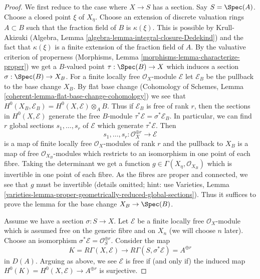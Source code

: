 \begin{proof}
We first reduce to the case where $X \to S$ has a section. Say $S = \Spec(A)$.
Choose a closed point $\xi$ of $X_\eta$. Choose an extension
of discrete valuation rings $A \subset B$ such that the fraction field
of $B$ is $\kappa(\xi)$. This is possible by Krull-Akizuki
(Algebra, Lemma \ref{algebra-lemma-integral-closure-Dedekind})
and the fact that $\kappa(\xi)$ is a finite extension of the
fraction field of $A$.
By the valuative criterion of properness
(Morphisms, Lemma \ref{morphisms-lemma-characterize-proper})
we get a $B$-valued point $\tau : \Spec(B) \to X$
which induces a section $\sigma : \Spec(B) \to X_B$.
For a finite locally free $\mathcal{O}_X$-module $\mathcal{E}$
let $\mathcal{E}_B$ be the pullback to the base change $X_B$.
By flat base change
(Cohomology of Schemes, Lemma \ref{coherent-lemma-flat-base-change-cohomology})
we see that $H^0(X_B, \mathcal{E}_B) = H^0(X, \mathcal{E}) \otimes_A B$.
Thus if $\mathcal{E}_B$ is free of rank $r$, then the sections in
$H^0(X, \mathcal{E})$ generate the free $B$-module
$\tau^*\mathcal{E} = \sigma^*\mathcal{E}_B$.
In particular, we can find $r$ global sections $s_1, \ldots, s_r$
of $\mathcal{E}$ which generate $\tau^*\mathcal{E}$. Then
$$
s_1, \ldots, s_r :
\mathcal{O}_X^{\oplus r}
\longrightarrow
\mathcal{E}
$$
is a map of finite locally free $\mathcal{O}_X$-modules of rank $r$
and the pullback to $X_B$ is a map of free $\mathcal{O}_{X_B}$-modules
which restricts to an isomorphism in one point of each fibre.
Taking the determinant we get a function
$g \in \Gamma(X_\eta, \mathcal{O}_{X_B})$
which is invertible in one point of each fibre.
As the fibres are proper and connected, we see that $g$
must be invertible (details omitted; hint: use Varieties, Lemma
\ref{varieties-lemma-proper-geometrically-reduced-global-sections}).
Thus it suffices to prove the lemma for the base change $X_B \to \Spec(B)$.

\medskip\noindent
Assume we have a section $\sigma : S \to X$. Let $\mathcal{E}$
be a finite locally free $\mathcal{O}_X$-module which is assumed
free on the generic fibre and on $X_n$ (we will choose $n$ later).
Choose an isomorphism $\sigma^*\mathcal{E} = \mathcal{O}_S^{\oplus r}$.
Consider the map
$$
K = R\Gamma(X, \mathcal{E}) \longrightarrow
R\Gamma(S, \sigma^*\mathcal{E}) = A^{\oplus r}
$$
in $D(A)$. Arguing as above, we see $\mathcal{E}$ is free if (and only if)
the induced map $H^0(K) = H^0(X, \mathcal{E}) \to A^{\oplus r}$ is surjective.


\end{proof}
